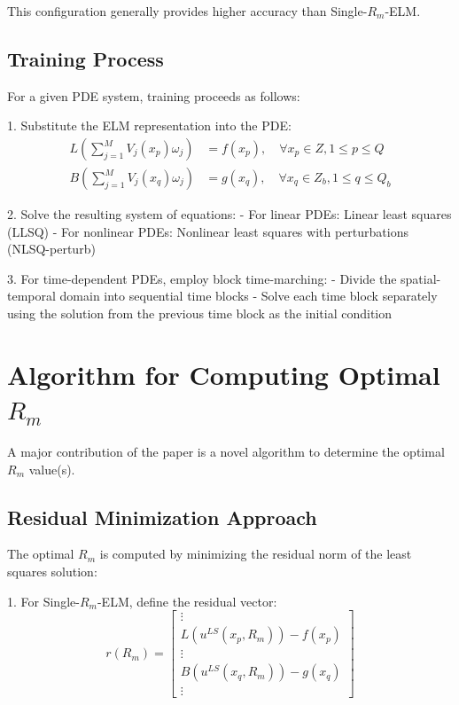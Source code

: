 \documentclass[11pt,a4paper]{article}
\begin{document}
This configuration generally provides higher accuracy than Single-$R_m$-ELM.

\subsection{Training Process}

For a given PDE system, training proceeds as follows:

1. Substitute the ELM representation into the PDE:
\begin{align}
    L\left(\sum_{j=1}^{M} V_j(x_p)\omega_j\right) &= f(x_p), \quad \forall x_p \in Z, 1 \leq p \leq Q \\
    B\left(\sum_{j=1}^{M} V_j(x_q)\omega_j\right) &= g(x_q), \quad \forall x_q \in Z_b, 1 \leq q \leq Q_b
\end{align}

2. Solve the resulting system of equations:
   - For linear PDEs: Linear least squares (LLSQ)
   - For nonlinear PDEs: Nonlinear least squares with perturbations (NLSQ-perturb)

3. For time-dependent PDEs, employ block time-marching:
   - Divide the spatial-temporal domain into sequential time blocks
   - Solve each time block separately using the solution from the previous time block as the initial condition

\section{Algorithm for Computing Optimal $R_m$}

A major contribution of the paper is a novel algorithm to determine the optimal $R_m$ value(s).

\subsection{Residual Minimization Approach}

The optimal $R_m$ is computed by minimizing the residual norm of the least squares solution:

1. For Single-$R_m$-ELM, define the residual vector:
\begin{equation}
    r(R_m) = 
    \begin{bmatrix}
    \vdots \\
    L(u^{LS}(x_p, R_m)) - f(x_p) \\
    \vdots \\
    B(u^{LS}(x_q, R_m)) - g(x_q) \\
    \vdots
    \end{bmatrix}
\end{equation}
\end{document}
